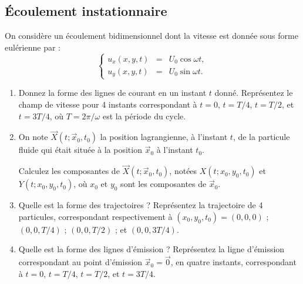  





\subsection{\'Ecoulement instationnaire}


On consid\`ere un \'ecoulement bidimensionnel dont la vitesse 
est donn\'ee sous forme eulérienne par :
\begin{equation*}
\left\{
\begin{array}{rcc}
u_x(x,y,t) & = & U_0 \cos \omega t, \\
u_y(x,y,t) & = & U_0 \sin \omega t. 
\end{array}
\right.
\end{equation*}

\begin{enumerate}

\item Donnez la forme des lignes de courant en un instant $t$ donné.
Représentez le champ de vitesse pour 4 instants correspondant 
à $t=0$, $t=T/4$, $t=T/2$, et $t=3T/4$, où 
$T = 2 \pi / \omega$ est la période du cycle.


\item On note $\vec X(t; \vec x_0, t_0)$ la position lagrangienne, à l'instant
$t$, de la particule fluide qui était située à la position $\vec x_0$  
à l'instant $t_0$. 

Calculez les composantes de $\vec X(t; \vec x_0, t_0)$,
notées  $X(t; x_0,y_0,t_0)$ et  $Y(t; x_0,y_0,t_0)$,
où $x_0$ et $y_0$ sont les composantes de $\vec x_0$.


\item Quelle est la forme des trajectoires ? Représentez la trajectoire
de 4 particules, correspondant respectivement à
$(x_0,y_0,t_0) = (0,0,0)$ ;  $(0,0,T/4)$ ; $(0,0,T/2)$ ; et $(0,0,3T/4)$.


\item Quelle est la forme des lignes d'émission ?
Représentez la ligne d'émission correspondant au 
point d'émission $\vec x_0 = \vec 0$, en quatre instants, 
correspondant à $t=0$, $t=T/4$, $t=T/2$, et $t=3T/4$. 

\end{enumerate}



